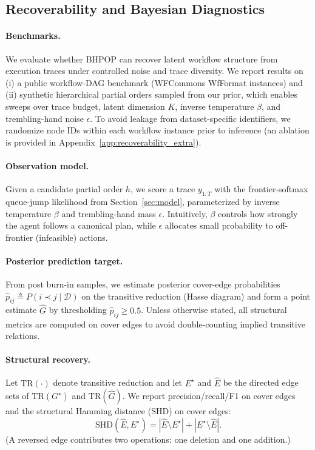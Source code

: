 \subsection{Recoverability and Bayesian Diagnostics}
\label{sec:recoverability_diagnostics}

\paragraph{Benchmarks.}
We evaluate whether BHPOP can recover latent workflow structure from execution traces under
controlled noise and trace diversity.
We report results on (i) a public workflow-DAG benchmark (WFCommons WfFormat instances) and
(ii) synthetic hierarchical partial orders sampled from our prior, which enables sweeps over
trace budget, latent dimension $K$, inverse temperature $\beta$, and trembling-hand noise $\epsilon$.
To avoid leakage from dataset-specific identifiers, we randomize node IDs within each workflow
instance prior to inference (an ablation is provided in Appendix~\ref{app:recoverability_extra}).

\paragraph{Observation model.}
Given a candidate partial order $h$, we score a trace $y_{1:T}$ with the frontier-softmax
queue-jump likelihood from Section~\ref{sec:model}, parameterized by inverse temperature
$\beta$ and trembling-hand mass $\epsilon$.
Intuitively, $\beta$ controls how strongly the agent follows a canonical plan, while $\epsilon$
allocates small probability to off-frontier (infeasible) actions.

\paragraph{Posterior prediction target.}
From post burn-in samples, we estimate posterior cover-edge probabilities
$\hat p_{ij} \triangleq P(i \prec j \mid \mathcal{D})$ on the transitive reduction
(Hasse diagram) and form a point estimate $\widehat{G}$ by thresholding $\hat p_{ij} \ge 0.5$.
Unless otherwise stated, all structural metrics are computed on cover edges to avoid
double-counting implied transitive relations.

\paragraph{Structural recovery.}
Let $\mathrm{TR}(\cdot)$ denote transitive reduction and let $E^\star$ and $\widehat{E}$ be
the directed edge sets of $\mathrm{TR}(G^\star)$ and $\mathrm{TR}(\widehat{G})$.
We report precision/recall/F1 on cover edges and the structural Hamming distance (SHD)
on cover edges:
\begin{equation}
\mathrm{SHD}(\widehat{E},E^\star)
= |\widehat{E}\setminus E^\star| + |E^\star\setminus \widehat{E}|.
\end{equation}
(A reversed edge contributes two operations: one deletion and one addition.)

